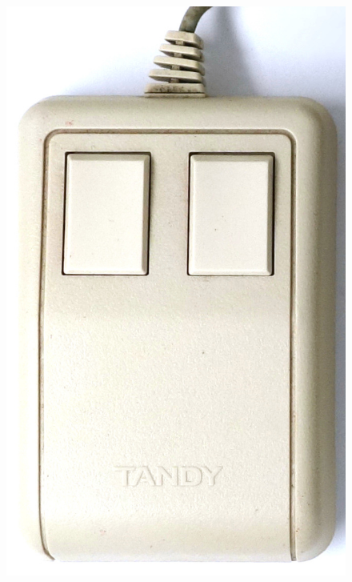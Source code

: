\documentclass[11pt, a4paper]{article}
\begin{document}
\begin{figure}[h]
    \centering
    \includegraphics[scale=0.65]{1988_tandy_trs80_deluxe_mouse/top_60.jpg}

\end{figure}
\end{document}
